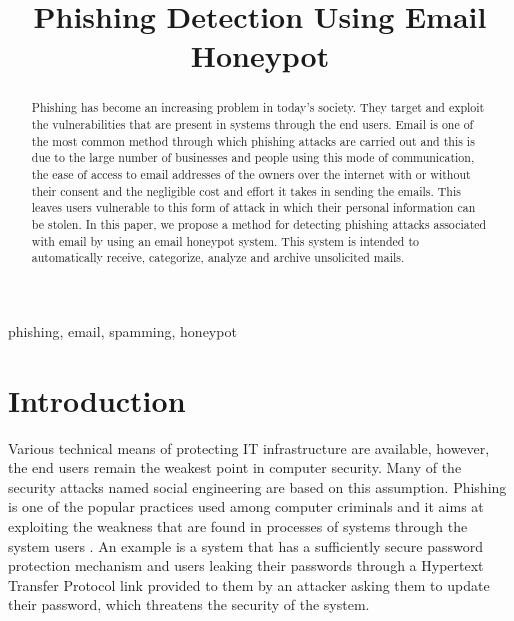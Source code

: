 \documentclass[conference]{IEEEtran}
\begin{document}
\title{Phishing Detection Using Email Honeypot\\}

\author{
\and
{}
}

\maketitle

\begin{abstract}
    Phishing has become an increasing problem in today’s society. They target and exploit the vulnerabilities that are present in systems through the end users. Email is one of the most common method through which phishing attacks are carried out and this is due to the large number of businesses and people using this mode of communication, the ease of access to email addresses of the owners over the internet with or without their consent and the negligible cost and effort it takes in sending the emails. This leaves users vulnerable to this form of attack in which their personal information can be stolen. In this paper, we propose a method for detecting phishing attacks associated with email by using an email honeypot system. This system is intended to automatically receive, categorize, analyze and archive unsolicited mails.
\end{abstract}

\begin{IEEEkeywords}
    phishing, email, spamming, honeypot
\end{IEEEkeywords}

\section{Introduction}
Various technical means of protecting IT infrastructure are available, however, the end users remain the weakest point in computer security. Many of the security attacks named social engineering are based on this assumption. Phishing is one of the popular practices used among computer criminals \cite{phigaro} and it aims at exploiting the weakness that are found in processes of systems through the system users \cite{khonji}. An example is a system that has a sufficiently secure password protection mechanism and users leaking their passwords through a Hypertext Transfer Protocol link provided to them by an attacker asking them to update their password, which threatens the security of the system.



    
\end{document}
